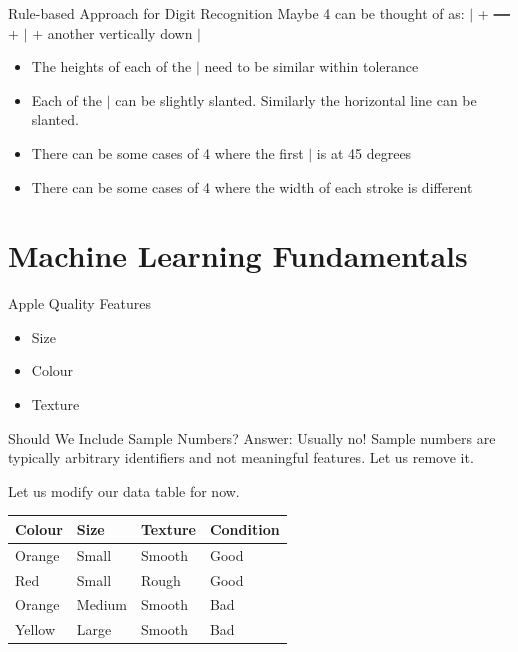 \documentclass[usenames,dvipsnames]{beamer}
\begin{document}
\begin{frame}{Rule-based Approach for Digit Recognition}
Maybe 4 can be thought of as: $\bm{|}$ + $\bm{\rule[0.5ex]{1em}{.95pt}}$ + $\bm{|}$ + another vertically down $\bm{|}$

\begin{itemize}
	\item \pause The heights of each of the $\bm{|}$ need to be similar within tolerance
	
	\item \pause Each of the $\bm{|}$ can be slightly slanted. Similarly the horizontal line can be slanted.
	\item \pause There can be some cases of 4 where the first $\bm{|}$ is at 45 degrees
	\item \pause There can be some cases of 4 where the width of each stroke is different
	
\end{itemize}

\end{frame}	

\section{Machine Learning Fundamentals}

\begin{frame}{Apple Quality Features}
\begin{itemize}
	\item Size
	\item \pause Colour
	\item \pause Texture
\end{itemize}
\end{frame}
  
\begin{frame}{Should We Include Sample Numbers?}
Answer: Usually no! Sample numbers are typically arbitrary identifiers and not meaningful features. Let us remove it.

\pause Let us modify our data table for now.

\begin{table}[]
	\begin{tabular}{|l|l|l||l|}
		\hline 
		\textbf{Colour} & \textbf{Size} & \textbf{Texture} & \textbf{Condition} \\ \hline 
		Orange & Small & Smooth  & Good      \\
		Red    & Small  & Rough  & Good \\
		Orange & Medium & Smooth & Bad \\
		Yellow & Large  & Smooth & Bad \\ \hline 

	\end{tabular}
\end{table}
\end{frame}
\end{document}
